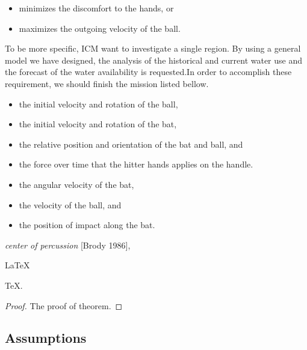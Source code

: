 \documentclass{mcmthesis}
\begin{document}

\begin{itemize}
\item minimizes the discomfort to the hands, or
\item maximizes the outgoing velocity of the ball.
\end{itemize}

	To be more specific, ICM want to investigate a single region. By using a general model we have designed, the analysis of the historical and current water use and the forecast of the water availability is requested.In order to accomplish these requirement, we should finish the mission listed bellow.

\begin{itemize}
\item the initial velocity and rotation of the ball,
\item the initial velocity and rotation of the bat,
\item the relative position and orientation of the bat and ball, and
\item the force over time that the hitter hands applies on the handle.
\end{itemize}



\lipsum[3]
\begin{itemize}

\item the angular velocity of the bat,
\item the velocity of the ball, and
\item the position of impact along the bat.
\end{itemize}
\lipsum[4]
\emph{center of percussion} [Brody 1986], \lipsum[5]



\begin{Theorem} \label{thm:latex}
\LaTeX
\end{Theorem}
\begin{Lemma} \label{thm:tex}
\TeX .
\end{Lemma}
\begin{proof}
The proof of theorem.
\end{proof}


\subsection{Assumptions}
\lipsum[6]


\lipsum[7]
\end{document}
